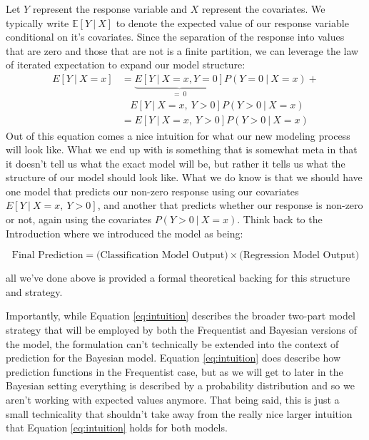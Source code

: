 \documentclass[12pt,twoside]{reedthesis}
\begin{document}
Let \(Y\) represent the response variable and \(X\) represent the covariates. We typically write \(\mathbb{E}[Y \ | \ X]\) to denote the expected value of our response variable conditional on it's covariates. Since the separation of the response into values that are zero and those that are not is a finite partition, we can leverage the law of iterated expectation to expand our model structure:
\begin{equation}
\begin{split}
    E[ Y  \ | \ X = x] &= \underbrace{E[Y \ | \ X = x, Y = 0]}_{= \ 0}P(Y = 0 \ | \ X = x) + \\
    & \ \ \ \ E[Y \ | \ X = x, \ Y > 0]P(Y> 0 \ | \ X = x) \\
    &= E[Y \ | \ X = x, \ Y > 0]P(Y > 0 \ | \ X = x) 
\end{split}
\label{eq:intuition}
\end{equation}
Out of this equation comes a nice intuition for what our new modeling process will look like. What we end up with is something that is somewhat meta in that it doesn't tell us what the exact model will be, but rather it tells us what the structure of our model should look like. What we do know is that we should have one model that predicts our non-zero response using our covariates \(E[Y \ | \ X = x, \ Y>0]\), and another that predicts whether our response is non-zero or not, again using the covariates \(P(Y > 0 \ | \ X = x)\). Think back to the Introduction where we introduced the model as being:

\[
\text{Final Prediction} = \bigg(\text{Classification Model Output}\bigg) \times \bigg(\text{Regression Model Output}\bigg) 
\]

all we've done above is provided a formal theoretical backing for this structure and strategy.

Importantly, while Equation \eqref{eq:intuition} describes the broader two-part model strategy that will be employed by both the Frequentist and Bayesian versions of the model, the formulation can't technically be extended into the context of prediction for the Bayesian model. Equation \eqref{eq:intuition} does describe how prediction functions in the Frequentist case, but as we will get to later in the Bayesian setting everything is described by a probability distribution and so we aren't working with expected values anymore. That being said, this is just a small technicality that shouldn't take away from the really nice larger intuition that Equation \eqref{eq:intuition} holds for both models.
\end{document}
